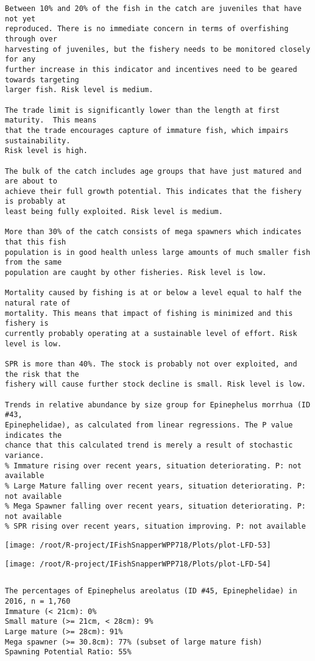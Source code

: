 \documentclass{report}\usepackage[]{graphicx}\usepackage[]{color}
\makeatletter
\def\maxwidth{ %
  \ifdim\Gin@nat@width>\linewidth
    \linewidth
  \else
    \Gin@nat@width
  \fi
}
\newenvironment{kframe}{%
 \def\at@end@of@kframe{}%
 \ifinner\ifhmode%
  \def\at@end@of@kframe{\end{minipage}}%
  \begin{minipage}{\columnwidth}%
 \fi\fi%
 \def\FrameCommand##1{\hskip\@totalleftmargin \hskip-\fboxsep
 \colorbox{shadecolor}{##1}\hskip-\fboxsep
     \hskip-\linewidth \hskip-\@totalleftmargin \hskip\columnwidth}%
 \MakeFramed {\advance\hsize-\width
   \@totalleftmargin\z@ \linewidth\hsize
   \@setminipage}}%
 {\par\unskip\endMakeFramed%
 \at@end@of@kframe}
\newenvironment{knitrout}{}{} %
\makeatother
\begin{document}
\begin{knitrout}
\begin{kframe}
\begin{verbatim}
Between 10% and 20% of the fish in the catch are juveniles that have not yet
reproduced. There is no immediate concern in terms of overfishing through over
harvesting of juveniles, but the fishery needs to be monitored closely for any
further increase in this indicator and incentives need to be geared towards targeting
larger fish. Risk level is medium.

The trade limit is significantly lower than the length at first maturity.  This means
that the trade encourages capture of immature fish, which impairs sustainability.
Risk level is high.

The bulk of the catch includes age groups that have just matured and are about to
achieve their full growth potential. This indicates that the fishery is probably at
least being fully exploited. Risk level is medium.

More than 30% of the catch consists of mega spawners which indicates that this fish
population is in good health unless large amounts of much smaller fish from the same
population are caught by other fisheries. Risk level is low.
 
Mortality caused by fishing is at or below a level equal to half the natural rate of
mortality. This means that impact of fishing is minimized and this fishery is
currently probably operating at a sustainable level of effort. Risk level is low.
 
SPR is more than 40%. The stock is probably not over exploited, and the risk that the
fishery will cause further stock decline is small. Risk level is low.
 
Trends in relative abundance by size group for Epinephelus morrhua (ID #43,
Epinephelidae), as calculated from linear regressions. The P value indicates the
chance that this calculated trend is merely a result of stochastic variance.
% Immature rising over recent years, situation deteriorating. P: not available
% Large Mature falling over recent years, situation deteriorating. P: not available
% Mega Spawner falling over recent years, situation deteriorating. P: not available
% SPR rising over recent years, situation improving. P: not available
\end{verbatim}
\end{kframe}
\texttt{[image: /root/R-project/IFishSnapperWPP718/Plots/plot-LFD-53]} 

\texttt{[image: /root/R-project/IFishSnapperWPP718/Plots/plot-LFD-54]} 
\begin{kframe}\begin{verbatim}
\end{verbatim}
\end{kframe}
\clearpage
\newpage
\begin{kframe}\begin{verbatim}The percentages of Epinephelus areolatus (ID #45, Epinephelidae) in 2016, n = 1,760
Immature (< 21cm): 0%
Small mature (>= 21cm, < 28cm): 9%
Large mature (>= 28cm): 91%
Mega spawner (>= 30.8cm): 77% (subset of large mature fish)
Spawning Potential Ratio: 55%
 

\end{verbatim}
\end{kframe}
\end{knitrout}
\end{document}

